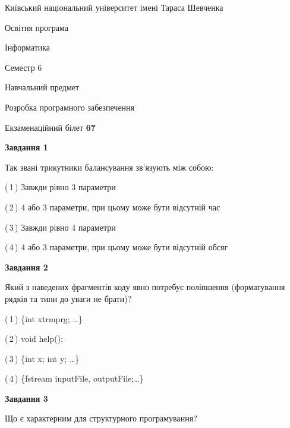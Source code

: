 \documentclass[10pt, ukrainian]{article}
\begin{document}
{{\begin {small}\par
{ \center  Київський національний університет імені Тараса Шевченка \par}
{\parbox {5 cm}{Освітня програма \hfill}{\parbox {7 cm}{Інформатика \hfill}}\parbox {6 cm}{\hfill Семестр 6}}\par
{\parbox {5 cm} {Навчальний предмет \hfill}\parbox {7 cm}{Розробка програмного забезпечення \hfill}\parbox {6cm}{\hfill}\par}\vspace{-7pt} \end{small}}{\center Екзаменаційний білет \No \textbf
{ 67 }\par}}
{
\begin {large}
{\begin {center}\textbf{Завдання 1}\end {center}}\par
Так звані трикутники балансування зв'язують між собою:\par
\vspace{2mm}



(\,1\,) Завжди рівно 3 параметри%



(\,2\,) 4 або 3 параметри, при цьому може бути відсутній час%



(\,3\,) Завжди рівно 4 параметри%



(\,4\,) 4 або 3 параметри, при цьому може бути відсутній обсяг %


{\begin {center}\textbf{Завдання 2}\end {center}}\par
Який з наведених фрагментів коду явно потребує поліпшення (форматування рядків та типи до уваги не брати)?\par
\vspace{2mm}



(\,1\,) \{int xtrmprg; …\}%



(\,2\,) void help();%



(\,3\,) \{int x; int y; …\}%



(\,4\,) \{fstream inputFile, outputFile;…\} %


{\begin {center}\textbf{Завдання 3}\end {center}}\par
Що є характерним для структурного програмування?\par
\vspace{2mm}




\end{large}}
\end{document}
